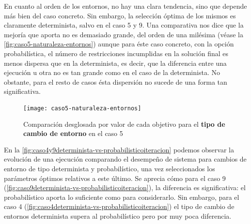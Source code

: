 En cuanto al orden de los entornos, no hay una clara tendencia, sino que depende más bien del caso concreto. Sin embargo, la selección óptima de los mismos es claramente determinista, salvo en el caso 5 y 9. 
Una comparativa nos dice que la mejoría que aporta no es demasiado grande, del orden de una milésima (véase la \autoref{fig:caso5-naturaleza-entornos}) aunque para éste caso concreto, con la opción probabilística, el número de restricciones incumplidas en la solución final es menos dispersa que en la determinista, es decir, que la diferencia entre una ejecución u otra no es tan grande como en el caso de la determinista. No obstante, para el resto de casos ésta dispersión no sucede de una forma tan significativa.

\begin{figure}
	\centering
	\texttt{[image: caso5-naturaleza-entornos]}
	\caption{Comparación desglosada por valor de cada objetivo para el \textbf{tipo de cambio de entorno} en el caso 5}
	\label{fig:caso5-naturaleza-entornos}
\end{figure}

En la \autoref{fig:caso4y9determinista-vs-probabilisticoiteracion} podemos observar la evolución de una ejecución comparando el desempeño de sistema para cambios de entorno de tipo determinista y probabilístico, una vez seleccionados los parámetros óptimos relativos a este último. Se aprecia cómo para el caso 9  (\autoref{fig:caso9determinista-vs-probabilisticoiteracion}), la diferencia es significativa: el probabilístico aporta lo suficiente como para considerarlo. Sin embargo, para el caso 4 (\autoref{fig:caso4determinista-vs-probabilisticoiteracion}) el tipo de cambio de entornos determinista supera al probabilístico pero por muy poca diferencia.

